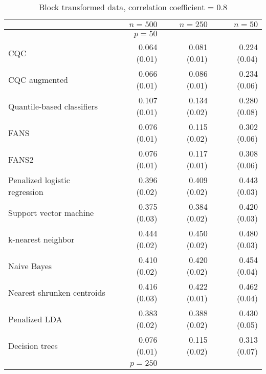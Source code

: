 \begin{table}[p]
  \centering
  \caption{Block transformed data, correlation coefficient = 0.8}
  \label{tab:block-transformed-corr08}
  \vspace{5mm}  

  \begin{adjustbox}{max size={\textwidth}{10cm}}
    \begin{tabular}{l@{\extracolsep{15mm}}rrr}
      
      \hline
      & $n=500$ & $n=250$ & $n=50$ \\ 
      \hline
      & $p = 50$ \\
      \hline

      CQC & 0.064 (0.01) & 0.081 (0.01) & 0.224 (0.04) \\ 
      CQC augmented & 0.066 (0.01) & 0.086 (0.01) & 0.234 (0.06) \\ 
      Quantile-based classifiers & 0.107 (0.01) & 0.134 (0.02) & 0.280 (0.08) \\ 
      FANS  & 0.076 (0.01) & 0.115 (0.02) & 0.302 (0.06) \\
      FANS2 & 0.076 (0.01) & 0.117 (0.01) & 0.308 (0.06) \\
      Penalized logistic regression & 0.396 (0.02) & 0.409 (0.02) & 0.443 (0.03) \\ 
      Support vector machine & 0.375 (0.03) & 0.384 (0.02) & 0.420 (0.03) \\ 
      k-nearest neighbor & 0.444 (0.02) & 0.450 (0.02) & 0.480 (0.03) \\ 
      Naive Bayes & 0.410 (0.02) & 0.420 (0.02) & 0.454 (0.04) \\ 
      Nearest shrunken centroids & 0.416 (0.03) & 0.422 (0.01) & 0.462 (0.04) \\ 
      Penalized LDA & 0.383 (0.02) & 0.388 (0.02) & 0.430 (0.05) \\ 
      Decision trees & 0.076 (0.01) & 0.115 (0.02) & 0.313 (0.07) \\ [2ex]

      \hline
      & $p = 250$ \\
      \hline


\end{tabular}
\end{adjustbox}
\end{table}
